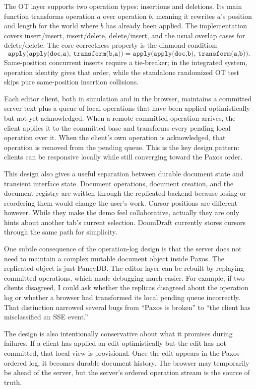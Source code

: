 \documentclass[11pt]{article}
\newcommand{\code}[1]{\texttt{#1}}
\begin{document}
The OT layer supports two operation types: insertions and deletions. Its main function transforms operation \(a\) over operation \(b\), meaning it rewrites \(a\)'s position and length for the world where \(b\) has already been applied. The implementation covers insert/insert, insert/delete, delete/insert, and the usual overlap cases for delete/delete. The core correctness property is the diamond condition:
\[
\code{apply(apply(doc,a), transform(b,a))} =
\code{apply(apply(doc,b), transform(a,b))}.
\]
Same-position concurrent inserts require a tie-breaker; in the integrated system, operation identity gives that order, while the standalone randomized OT test skips pure same-position insertion collisions.

Each editor client, both in simulation and in the browser, maintains a committed server text plus a queue of local operations that have been applied optimistically but not yet acknowledged. When a remote committed operation arrives, the client applies it to the committed base and transforms every pending local operation over it. When the client's own operation is acknowledged, that operation is removed from the pending queue. This is the key design pattern: clients can be responsive locally while still converging toward the Paxos order.

This design also gives a useful separation between durable document state and transient interface state. Document operations, document creation, and the document registry are written through the replicated backend because losing or reordering them would change the user's work. Cursor positions are different however. While they make the demo feel collaborative, actually they are only hints about another tab's current selection. DoomDraft currently stores cursors through the same path for simplicity.

One subtle consequence of the operation-log design is that the server does not need to maintain a complex mutable document object inside Paxos. The replicated object is just PancyDB. The editor layer can be rebuilt by replaying committed operations, which made debugging much easier. For example, if two clients disagreed, I could ask whether the replicas disagreed about the operation log or whether a browser had transformed its local pending queue incorrectly. That distinction narrowed several bugs from ``Paxos is broken'' to ``the client has misclassified an SSE event.''

The design is also intentionally conservative about what it promises during failures. If a client has applied an edit optimistically but the edit has not committed, that local view is provisional. Once the edit appears in the Paxos-ordered log, it becomes durable document history. The browser may temporarily be ahead of the server, but the server's ordered operation stream is the source of truth.
\end{document}
